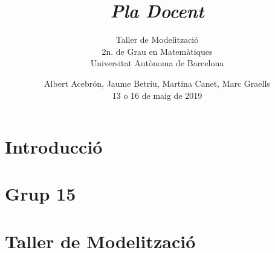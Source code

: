 \documentclass[twocolumn]{beamer}
\begin{document}
\section{Introducció}
\title{\textit{Pla Docent}}
\subtitle{\color{blue!20!black} Taller de Modelització \\ 2n. de Grau en  Matemàtiques \\ \color{black} Universitat Autònoma de Barcelona}
\date{Albert Acebrón, Jaume Betriu, Martina Canet, Marc Graells\\ 13 o 16 de maig de 2019 \\}
\section{Grup 15}
\section{Taller de Modelització}
\begin{frame} 
\maketitle
\centering
\end{frame}
\end{document}
